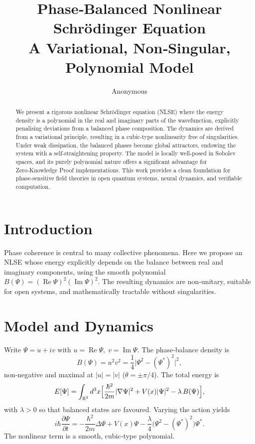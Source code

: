 \documentclass[11pt]{article}
\title{\textbf{Phase‑Balanced Nonlinear Schr\"odinger Equation}\\
A Variational, Non‑Singular, Polynomial Model}
\author{Anonymous}
\date{}
\begin{document}
\maketitle

\begin{abstract}
We present a rigorous nonlinear Schr\"odinger equation (NLSE) where the energy density is a polynomial in the real and imaginary parts of the wavefunction, explicitly penalising deviations from a balanced phase composition. The dynamics are derived from a variational principle, resulting in a cubic‑type nonlinearity free of singularities. Under weak dissipation, the balanced phases become global attractors, endowing the system with a self‑straightening property. The model is locally well‑posed in Sobolev spaces, and its purely polynomial nature offers a significant advantage for Zero‑Knowledge Proof implementations. This work provides a clean foundation for phase‑sensitive field theories in open quantum systems, neural dynamics, and verifiable computation.
\end{abstract}

\section{Introduction}
Phase coherence is central to many collective phenomena. Here we propose an NLSE whose energy explicitly depends on the balance between real and imaginary components, using the smooth polynomial \(B(\Psi) = (\operatorname{Re}\Psi)^2(\operatorname{Im}\Psi)^2\). The resulting dynamics are non‑unitary, suitable for open systems, and mathematically tractable without singularities.

\section{Model and Dynamics}
Write \(\Psi = u + iv\) with \(u = \operatorname{Re}\Psi,\; v = \operatorname{Im}\Psi\). The phase‑balance density is
\begin{equation}\label{eq:B}
B(\Psi) = u^2 v^2 = \frac{1}{4}\bigl|\Psi^2 - (\Psi^*)^2\bigr|^2 ,
\end{equation}
non‑negative and maximal at \(|u| = |v|\) (\(\theta = \pm \pi/4\)). The total energy is
\begin{equation}\label{eq:E}
E[\Psi] = \int_{\mathbb{R}^3} d^3x \Bigl[ \frac{\hbar^2}{2m}|\nabla\Psi|^2 + V(x)|\Psi|^2 - \lambda\,B(\Psi) \Bigr],
\end{equation}
with \(\lambda>0\) so that balanced states are favoured. Varying the action yields
\begin{equation}\label{eq:NLSE}
\boxed{ i\hbar\frac{\partial\Psi}{\partial t} = -\frac{\hbar^2}{2m}\Delta\Psi + V(x)\Psi - \frac{\lambda}{4}\bigl(\Psi^2 - (\Psi^*)^2\bigr)\Psi^* }.
\end{equation}
The nonlinear term is a smooth, cubic‑type polynomial.
\end{document}
